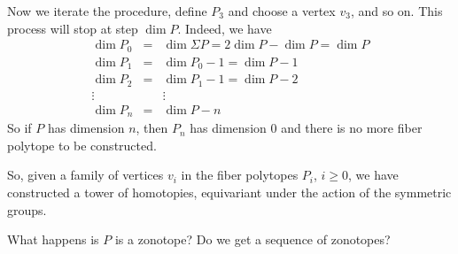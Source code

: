 Now we iterate the procedure, define $P_3$ and choose a vertex $v_3$, and so on.
This process will stop at step $\dim P$.
Indeed, we have
\begin{eqnarray*}
    \dim P_0 & = & \dim \Sigma P = 2 \dim P - \dim P = \dim P \\
    \dim P_1 & = & \dim P_0 -1 = \dim P -1 \\
    \dim P_2 & = & \dim P_1 - 1 = \dim P -2 \\
    \vdots & & \vdots  \\
    \dim P_n & = &\dim P - n
\end{eqnarray*}
So if $P$ has dimension $n$, then $P_n$ has dimension 0 and there is no more fiber polytope to be constructed.

So, given a family of vertices $v_i$ in the fiber polytopes $P_i$, $i\geq 0$, we have constructed a tower of homotopies, equivariant under the action of the symmetric groups.

\begin{example}
\end{example}

\begin{example}
\end{example}

\begin{example}
\end{example}

\begin{example} What happens is $P$ is a zonotope? Do we get a sequence of zonotopes?
\end{example}





